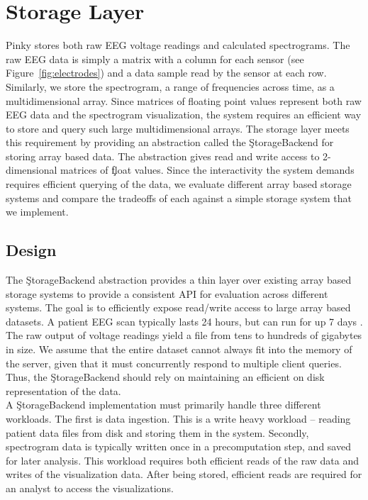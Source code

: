 \chapter{Storage Layer}\label{storage-ch}

Pinky stores both raw EEG voltage readings and calculated spectrograms. The raw
EEG data is simply a matrix with a column for each sensor (see
Figure~\ref{fig:electrodes}) and a data sample read by the sensor at each row.
Similarly, we store the spectrogram, a range of frequencies across time, as a
multidimensional array. Since matrices of floating point values represent both
raw EEG data and the spectrogram visualization, the system requires an
efficient way to store and query such large multidimensional arrays. The
storage layer meets this requirement by providing an abstraction called the
\c{StorageBackend} for storing array based data. The abstraction gives read and
write access to 2-dimensional matrices of \c{float} values. Since the
interactivity the system demands requires efficient querying of the data, we
evaluate different array based storage systems and compare the tradeoffs of
each against a simple storage system that we implement.

\section{Design}

The \c{StorageBackend} abstraction provides a thin layer over existing array
based storage systems to provide a consistent API for evaluation across
different systems. The goal is to efficiently expose read/write access to large
array based datasets. A patient EEG scan typically lasts 24 hours, but can run
for up 7 days \cite{ceeg-3}. The raw output of voltage readings yield a file
from tens to hundreds of gigabytes in size. We assume that the entire dataset
cannot always fit into the memory of the server, given that it must
concurrently respond to multiple client queries. Thus, the \c{StorageBackend}
should rely on maintaining an efficient on disk representation of the data. \\

A \c{StorageBackend} implementation must primarily handle three different
workloads. The first is data ingestion. This is a write heavy workload --
reading patient data files from disk and storing them in the system. Secondly,
spectrogram data is typically written once in a precomputation step, and saved
for later analysis. This workload requires both efficient reads of the raw data
and writes of the visualization data. After being stored, efficient reads are
required for an analyst to access the visualizations.

